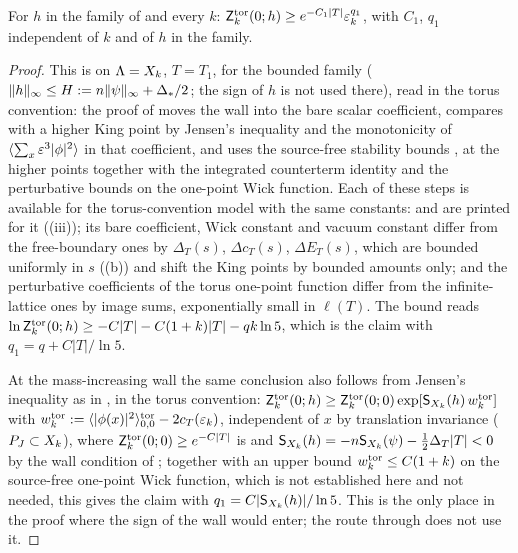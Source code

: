 \begin{proposition}\label{rot:prop:H6S2}
For $h$ in the family of  and every $k$: $\mathsf Z^{\rm tor}_k(0;h)\ge e^{-C_1|T|}\varepsilon_k^{q_1}$, with $C_1$, $q_1$ independent of $k$ and of $h$ in the family.
\end{proposition}
\begin{proof}
This is  on $\Lambda=X_k$, $T=T_1$, for the bounded family ($\|h\|_\infty\le H:= n\|\psi\|_\infty+\Delta_*/2$; the sign of $h$ is not used there), read in the torus convention: the proof of  moves the wall into the bare scalar coefficient, compares with a higher King point by Jensen's inequality and the monotonicity of $\langle\sum_x\varepsilon^3|\phi|^2\rangle$ in that coefficient, and uses the source-free stability bounds \cite[(1.14)]{Ba1}, \cite[(1.3)]{Ba2} at the higher points together with the integrated counterterm identity and the perturbative bounds on the one-point Wick function. Each of these steps is available for the torus-convention model with the same constants: \cite[(1.14)]{Ba1} and \cite[(1.3)]{Ba2} are printed for it ((iii)); its bare coefficient, Wick constant and vacuum constant differ from the free-boundary ones by $\Delta_T(s)$, $\Delta c_T(s)$, $\Delta E_T(s)$, which are bounded uniformly in $s$ ((b)) and shift the King points by bounded amounts only; and the perturbative coefficients of the torus one-point function differ from the infinite-lattice ones by image sums, exponentially small in $\ell(T)$. The bound reads $\ln\mathsf Z^{\rm tor}_k(0;h)\ge-C|T|-C(1+k)|T|-qk\ln5$, which is the claim with $q_1=q+C|T|/\ln5$.

At the mass-increasing wall the same conclusion also follows from Jensen's inequality as in , in the torus convention: $\mathsf Z^{\rm tor}_k(0;h)\ge\mathsf Z^{\rm tor}_k(0;0)\exp[\mathsf S_{X_k}(h)\,w^{\rm tor}_k]$ with $w^{\rm tor}_k:=\langle|\phi(x)|^2\rangle^{\rm tor}_{0,0}-2c_T(\varepsilon_k)$, independent of $x$ by translation invariance ($P_J\subset X_k$), where $\mathsf Z^{\rm tor}_k(0;0)\ge e^{-C|T|}$ is \cite[(1.14)]{Ba1} and $\mathsf S_{X_k}(h)=-n\mathsf S_{X_k}(\psi)-\frac12\Delta_T|T|<0$ by the wall condition of ; together with an upper bound $w^{\rm tor}_k\le C(1+k)$ on the source-free one-point Wick function, which is not established here and not needed, this gives the claim with $q_1=C|\mathsf S_{X_k}(h)|/\ln5$. This is the only place in the proof where the sign of the wall would enter; the route through  does not use it.
\end{proof}

